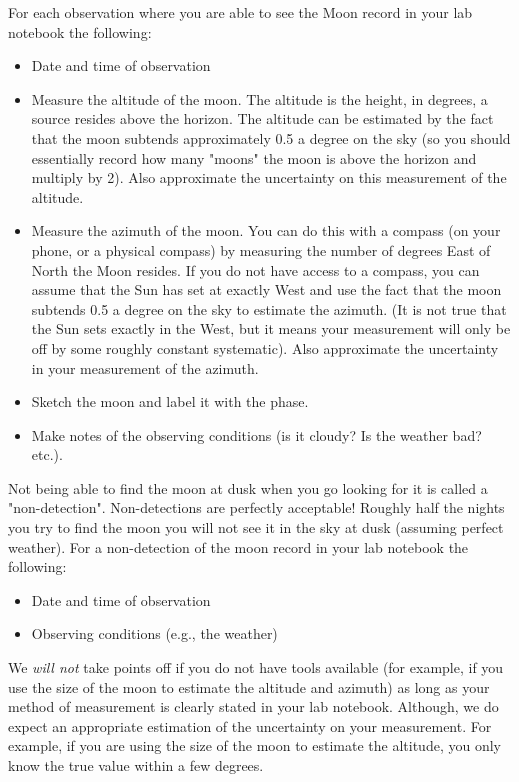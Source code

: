 \documentclass[11pt]{article}
\begin{document}
For each observation where you are able to see the Moon record in your lab notebook the following:
\begin{itemize}
\item Date and time of observation
\item Measure the altitude of the moon. The altitude is the height, in degrees, a source resides above the horizon.
The altitude can be estimated by the fact that the moon subtends approximately 0.5 a degree
on the sky (so you should essentially record how many "moons" the moon is above the horizon and multiply by 2).
Also approximate the uncertainty on this measurement of the altitude.
\item Measure the azimuth of the moon. You can do this with a compass (on your phone, or
a physical compass) by measuring the number of degrees East of North the Moon resides.
If you do not have access to a compass, you can assume that the Sun has set at exactly
West and use the fact that the moon subtends 0.5 a degree on the sky to estimate the azimuth.
(It is not true that the Sun sets exactly in the West, but it means your measurement will only be
off by some roughly constant systematic). Also approximate the uncertainty in your measurement
of the azimuth.
\item Sketch the moon and label it with the phase.
\item Make notes of the observing conditions (is it cloudy? Is the weather bad? etc.).
\end{itemize}

Not being able to find the moon at dusk when you go looking for it is called a "non-detection".
Non-detections are perfectly acceptable! Roughly half the nights you try to find the
moon you will not see it in the sky at dusk (assuming perfect weather). For a non-detection of
the moon record in your lab notebook the following:
\begin{itemize}
\item Date and time of observation
\item Observing conditions (e.g., the weather)
\end{itemize}

We \emph{will not} take points off if you do not have tools available (for example, if you use the
size of the moon to estimate the altitude and azimuth) as long as your method of measurement is clearly
stated in your lab notebook. Although, we do expect an appropriate estimation of the
uncertainty on your measurement. For example, if you are using the size of the moon to
estimate the altitude, you only know the true value within a few degrees. 
\end{document}
